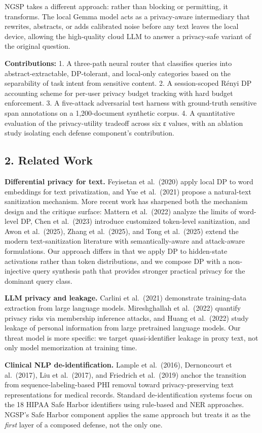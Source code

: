 NGSP takes a different approach: rather than blocking or permitting, it
transforms. The local Gemma model acts as a privacy-aware intermediary
that rewrites, abstracts, or adds calibrated noise before any text
leaves the local device, allowing the high-quality cloud LLM to answer a
privacy-safe variant of the original question.

\textbf{Contributions:} 1. A three-path neural router that classifies
queries into abstract-extractable, DP-tolerant, and local-only
categories based on the separability of task intent from sensitive
content. 2. A session-scoped Rényi DP accounting scheme for per-user
privacy budget tracking with hard budget enforcement. 3. A five-attack
adversarial test harness with ground-truth sensitive span annotations on
a 1,200-document synthetic corpus. 4. A quantitative evaluation of the
privacy-utility tradeoff across six ε values, with an ablation study
isolating each defense component's contribution.

\subsection{2. Related Work}\label{related-work}

\textbf{Differential privacy for text.} Feyisetan et al.~(2020) apply
local DP to word embeddings for text privatization, and Yue et
al.~(2021) propose a natural-text sanitization mechanism. More recent
work has sharpened both the mechanism design and the critique surface:
Mattern et al.~(2022) analyze the limits of word-level DP, Chen et
al.~(2023) introduce customized token-level sanitization, and Awon et
al.~(2025), Zhang et al.~(2025), and Tong et al.~(2025) extend the
modern text-sanitization literature with semantically-aware and
attack-aware formulations. Our approach differs in that we apply DP to
hidden-state activations rather than token distributions, and we compose
DP with a non-injective query synthesis path that provides stronger
practical privacy for the dominant query class.

\textbf{LLM privacy and leakage.} Carlini et al.~(2021) demonstrate
training-data extraction from large language models. Mireshghallah et
al.~(2022) quantify privacy risks via membership inference attacks, and
Huang et al.~(2022) study leakage of personal information from large
pretrained language models. Our threat model is more specific: we target
quasi-identifier leakage in proxy text, not only model memorization at
training time.

\textbf{Clinical NLP de-identification.} Lample et al.~(2016),
Dernoncourt et al.~(2017), Liu et al.~(2017), and Friedrich et
al.~(2019) anchor the transition from sequence-labeling-based PHI
removal toward privacy-preserving text representations for medical
records. Standard de-identification systems focus on the 18 HIPAA Safe
Harbor identifiers using rule-based and NER approaches. NGSP's Safe
Harbor component applies the same approach but treats it as the
\emph{first} layer of a composed defense, not the only one.

